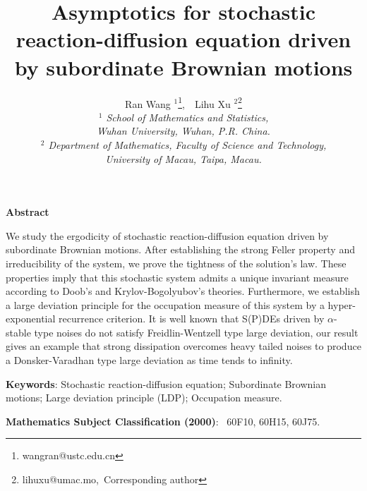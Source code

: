 \documentclass[12pt,a4paper]{article}
\theoremstyle{definition}
\theoremstyle{remark}
\numberwithin{equation}{section}
\begin{document}
\title{Asymptotics  for stochastic  reaction-diffusion equation driven by  subordinate    Brownian motions}

\footnotesize{\author {Ran Wang $^{1}$\thanks{wangran@ustc.edu.cn},\ \
Lihu Xu $^{2}$\thanks{lihuxu@umac.mo,\ Corresponding author}\\
 {\em $^1$ School of Mathematics and Statistics, }\\
 {\em Wuhan University, Wuhan,  P.R. China.  }\\
  {\em $^2$ Department of Mathematics, Faculty of Science and Technology, }\\
  {\em  University of  Macau, Taipa, Macau.}
}



\maketitle
\begin{minipage}{140mm}
\begin{center}
{\bf Abstract}
\end{center}
We study the ergodicity of stochastic reaction-diffusion equation driven by  subordinate Brownian motions.
   After establishing the strong Feller property and irreducibility of the system,  we prove  the tightness of the solution's law.  These properties imply that this stochastic system admits a unique invariant measure according to Doob's and  Krylov-Bogolyubov's theories.
   Furthermore, we establish a large deviation principle for the occupation measure of  this system by a hyper-exponential recurrence criterion.  It is well known that S(P)DEs driven by $\alpha$-stable type noises do not satisfy Freidlin-Wentzell type large deviation, our result gives an example that
strong dissipation overcomes heavy tailed noises to produce a Donsker-Varadhan type large deviation as time tends to infinity.
\end{minipage}

\vspace{4mm}

\medskip
\noindent
{\bf Keywords}: Stochastic reaction-diffusion equation;  Subordinate  Brownian motions;   Large deviation principle (LDP);  Occupation measure.

\medskip
\noindent
{\bf Mathematics Subject Classification (2000)}: \ {60F10, 60H15,  60J75}.




}
\end{document}
